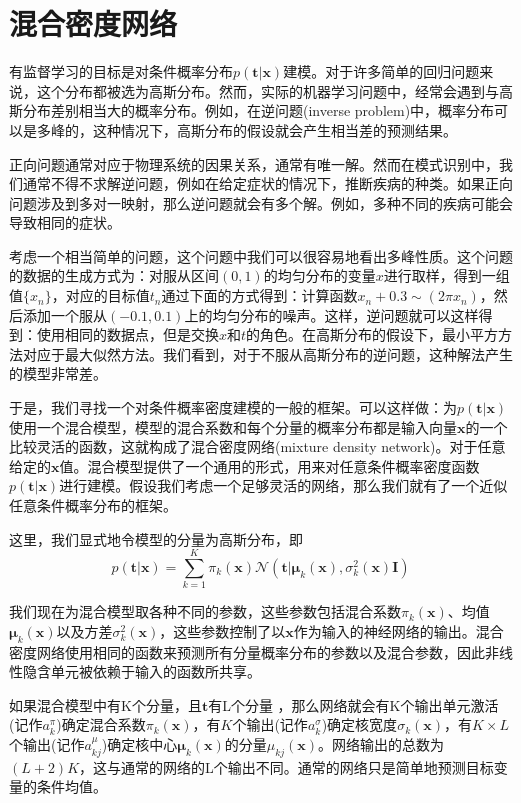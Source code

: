 \section{混合密度网络}
有监督学习的目标是对条件概率分布$p(\boldsymbol{t}|\boldsymbol{x})$建模。对于许多简单的回归问题来说，这个分布都被选为高斯分布。然而，实际的机器学习问题中，经常会遇到与高斯分布差别相当大的概率分布。例如，在逆问题(inverse problem)中，概率分布可以是多峰的，这种情况下，高斯分布的假设就会产生相当差的预测结果。

正向问题通常对应于物理系统的因果关系，通常有唯一解。然而在模式识别中，我们通常不得不求解逆问题，例如在给定症状的情况下，推断疾病的种类。如果正向问题涉及到多对一映射，那么逆问题就会有多个解。例如，多种不同的疾病可能会导致相同的症状。

考虑一个相当简单的问题，这个问题中我们可以很容易地看出多峰性质。这个问题的数据的生成方式为：对服从区间$(0,1)$的均匀分布的变量$x$进行取样，得到一组值$\{x_n\}$，对应的目标值$t_n$通过下面的方式得到：计算函数$x_n+0.3\sim(2\pi x_n)$，然后添加一个服从$(-0.1,0.1)$上的均匀分布的噪声。这样，逆问题就可以这样得到：使用相同的数据点，但是交换$x$和$t$的角色。在高斯分布的假设下，最小平方方法对应于最大似然方法。我们看到，对于不服从高斯分布的逆问题，这种解法产生的模型非常差。

于是，我们寻找一个对条件概率密度建模的一般的框架。可以这样做：为$p(\boldsymbol{t}|\boldsymbol{x})$使用一个混合模型，模型的混合系数和每个分量的概率分布都是输入向量$\boldsymbol{x}$的一个比较灵活的函数，这就构成了混合密度网络(mixture density network)。对于任意给定的$\boldsymbol{x}$值。混合模型提供了一个通用的形式，用来对任意条件概率密度函数$p(\boldsymbol{t}|\boldsymbol{x})$进行建模。假设我们考虑一个足够灵活的网络，那么我们就有了一个近似任意条件概率分布的框架。

这里，我们显式地令模型的分量为高斯分布，即
\begin{equation}
	p(\boldsymbol{t}|\boldsymbol{x})=\sum_{k=1}^{K}\pi_k(\boldsymbol{x})\mathcal{N}(\boldsymbol{t}|\boldsymbol{\mu}_k(\boldsymbol{x}),\sigma_k^2(\boldsymbol{x})\boldsymbol{I})
\end{equation}

我们现在为混合模型取各种不同的参数，这些参数包括混合系数$\pi_k(\boldsymbol{x})$、均值$\boldsymbol{\mu}_k(\boldsymbol{x})$以及方差$\sigma_k^2(\boldsymbol{x})$，这些参数控制了以$\boldsymbol{x}$作为输入的神经网络的输出。混合密度网络使用相同的函数来预测所有分量概率分布的参数以及混合参数，因此非线性隐含单元被依赖于输入的函数所共享。

如果混合模型中有K个分量，且$\boldsymbol{t}$有L个分量 ，那么网络就会有K个输出单元激活(记作$a_k^{\pi}$)确定混合系数$\pi_k(\boldsymbol{x})$，有$K$个输出(记作$a_k^{\sigma}$)确定核宽度$\sigma_k(\boldsymbol{x})$，有$K\times L$个输出(记作$a_{kj}^{\mu}$)确定核中心$\boldsymbol{\mu}_k(\boldsymbol{x})$的分量$\mu_{kj}(\boldsymbol{x})$。网络输出的总数为$(L+2)K$，这与通常的网络的L个输出不同。通常的网络只是简单地预测目标变量的条件均值。

